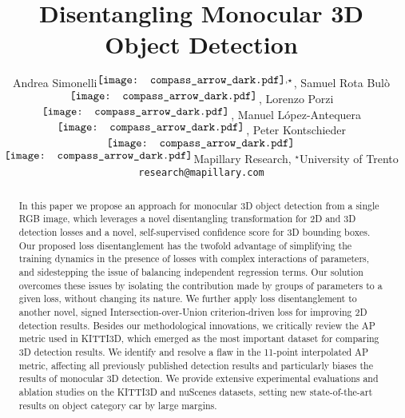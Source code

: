 \documentclass[10pt,twocolumn,letterpaper]{article}
\newcommand*{\dotcompass}{\ensuremath\vcenter{\hbox{\texttt{[image: compass\_arrow\_dark.pdf]}}}}
\begin{document}
\title{
\vspace{-20pt}
Disentangling Monocular 3D Object Detection\\
}


\author{Andrea Simonelli$^{\dotcompass,\star}$, Samuel Rota Bul\`o$^{\dotcompass}$, Lorenzo Porzi$^{\dotcompass}$, Manuel L\'opez-Antequera$^{\dotcompass}$, Peter Kontschieder$^{\dotcompass}$\\
$^{\dotcompass}$Mapillary Research, $^\star$University of Trento \\
{\tt\small research@mapillary.com}\\
}


\maketitle



\begin{abstract}
In this paper we propose an approach for monocular 3D object detection from a single RGB image, which leverages a novel disentangling transformation for 2D and 3D detection losses and a novel, self-supervised confidence score for 3D bounding boxes. Our proposed loss disentanglement has the twofold advantage of simplifying the training dynamics in the presence of losses with complex interactions of parameters, and sidestepping the issue of balancing independent regression terms. Our solution overcomes these issues by isolating the contribution made by groups of parameters to a given loss, without changing its nature. We further apply loss disentanglement to another novel, signed Intersection-over-Union criterion-driven loss for improving 2D detection results. Besides our methodological innovations, we critically review the AP metric used in KITTI3D, which emerged as the most important dataset for comparing 3D detection results. We identify and resolve a flaw in the 11-point interpolated AP metric, affecting all previously published detection results and particularly biases the results of monocular 3D detection. We provide extensive experimental evaluations and ablation studies on the KITTI3D and nuScenes datasets, setting new state-of-the-art results on object category car by large margins.
\end{abstract}
\end{document}
